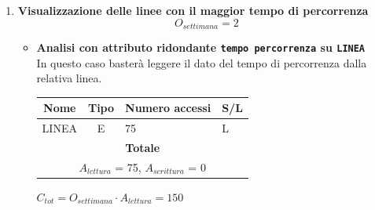 \documentclass[12pt,a4paper]{report}
\begin{document}
\begin{enumerate}[label=\textbf{\arabic*}]

    \item \textbf{Visualizzazione delle linee con il maggior tempo di percorrenza} \label{op14} \\
            \[ {O_{settimana} = 2} \]
           \begin{itemize}
            \item \textbf{Analisi con attributo ridondante \texttt{tempo percorrenza} su \texttt{LINEA}} \\
        In questo caso basterà leggere il dato del tempo di percorrenza dalla relativa linea.
        \begin{table}[H]
        \centering
        \begin{tabular}{|c|c|l|l|}
        \hline
        \textbf{Nome} & \textbf{Tipo} & \textbf{Numero accessi} & \textbf{S/L} \\
        \hline
        LINEA & E & 75 & L \\
        \hline
        \multicolumn{4}{c}{\textbf{Totale}} \\
        \multicolumn{4}{c}{${A_{lettura}}$ = 75, ${A_{scrittura}}$ = 0} \\
        \hline
        \end{tabular}
        \end{table}
        \begin{center}
        ${C_{tot} = {O_{settimana}}\cdot {A_{lettura}} = 150}$
        \end{center}


\end{itemize}
\end{enumerate}
\end{document}
